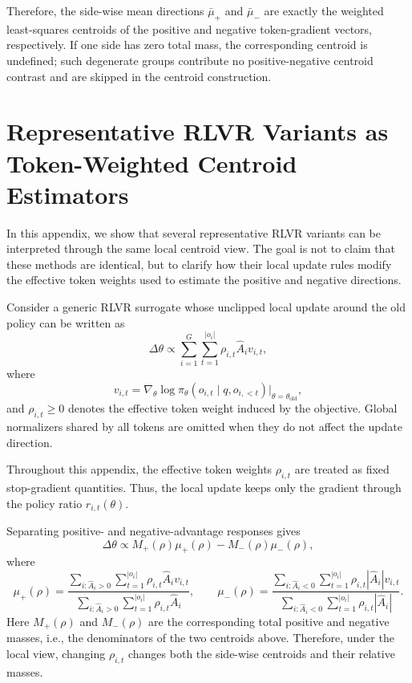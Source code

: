 \documentclass{article} %
\begin{document}
Therefore, the side-wise mean directions \(\bar\mu_+\) and \(\bar\mu_-\)
are exactly the weighted least-squares centroids of the positive and negative
token-gradient vectors, respectively. If one side has zero total mass, the
corresponding centroid is undefined; such degenerate groups contribute no
positive-negative centroid contrast and are skipped in the centroid
construction.

\section{Representative RLVR Variants as Token-Weighted Centroid Estimators}
\label{app:centroid-view-rlvr}

In this appendix, we show that several representative RLVR variants can be
interpreted through the same local centroid view. The goal is not to claim that
these methods are identical, but to clarify how their local update rules modify
the effective token weights used to estimate the positive and negative
directions.


Consider a generic RLVR surrogate whose unclipped local update around the old
policy can be written as
\begin{equation}
\label{eq:generic-local-update}
\Delta\theta
\propto
\sum_{i=1}^{G}\sum_{t=1}^{|o_i|}
\rho_{i,t}\hat A_i v_{i,t},
\end{equation}
where
\[
v_{i,t}
=
\nabla_\theta
\log \pi_\theta(o_{i,t}\mid q,o_{i,<t})
\Big|_{\theta=\theta_{\mathrm{old}}},
\]
and \(\rho_{i,t}\ge 0\) denotes the effective token weight induced by the
objective. Global normalizers shared by all tokens are omitted when they do not
affect the update direction. 

Throughout this appendix, the effective token weights \(\rho_{i,t}\) are treated
as fixed stop-gradient quantities. Thus, the local update keeps only the gradient through the policy
ratio \(r_{i,t}(\theta)\). 

Separating positive- and negative-advantage responses gives
\begin{equation}
\label{eq:generic-centroid-decomp}
\Delta\theta
\propto
M_+(\rho)\mu_+(\rho)
-
M_-(\rho)\mu_-(\rho),
\end{equation}
where
\begin{equation}
\label{eq:generic-centroids}
\mu_+(\rho)
=
\frac{
\sum_{i:\hat A_i>0}\sum_{t=1}^{|o_i|}
\rho_{i,t}\hat A_i v_{i,t}
}{
\sum_{i:\hat A_i>0}\sum_{t=1}^{|o_i|}
\rho_{i,t}\hat A_i
},
\qquad
\mu_-(\rho)
=
\frac{
\sum_{i:\hat A_i<0}\sum_{t=1}^{|o_i|}
\rho_{i,t}|\hat A_i| v_{i,t}
}{
\sum_{i:\hat A_i<0}\sum_{t=1}^{|o_i|}
\rho_{i,t}|\hat A_i|
}.
\end{equation}
Here \(M_+(\rho)\) and \(M_-(\rho)\) are the corresponding total positive and
negative masses, i.e., the denominators of the two centroids above. Therefore,
under the local view, changing \(\rho_{i,t}\) changes both the side-wise
centroids and their relative masses.
\end{document}
